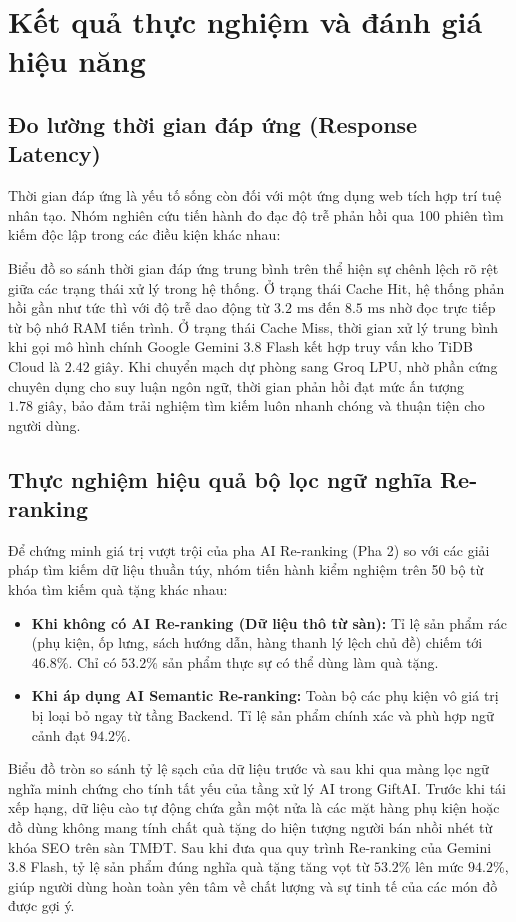 \section{Kết quả thực nghiệm và đánh giá hiệu năng}

\subsection{Đo lường thời gian đáp ứng (Response Latency)}
Thời gian đáp ứng là yếu tố sống còn đối với một ứng dụng web tích hợp trí tuệ nhân tạo. Nhóm nghiên cứu tiến hành đo đạc độ trễ phản hồi qua 100 phiên tìm kiếm độc lập trong các điều kiện khác nhau:


Biểu đồ so sánh thời gian đáp ứng trung bình trên thể hiện sự chênh lệch rõ rệt giữa các trạng thái xử lý trong hệ thống. Ở trạng thái Cache Hit, hệ thống phản hồi gần như tức thì với độ trễ dao động từ $3.2\text{ ms}$ đến $8.5\text{ ms}$ nhờ đọc trực tiếp từ bộ nhớ RAM tiến trình. Ở trạng thái Cache Miss, thời gian xử lý trung bình khi gọi mô hình chính Google Gemini 3.8 Flash kết hợp truy vấn kho TiDB Cloud là $2.42\text{ giây}$. Khi chuyển mạch dự phòng sang Groq LPU, nhờ phần cứng chuyên dụng cho suy luận ngôn ngữ, thời gian phản hồi đạt mức ấn tượng $1.78\text{ giây}$, bảo đảm trải nghiệm tìm kiếm luôn nhanh chóng và thuận tiện cho người dùng.

\subsection{Thực nghiệm hiệu quả bộ lọc ngữ nghĩa Re-ranking}
Để chứng minh giá trị vượt trội của pha AI Re-ranking (Pha 2) so với các giải pháp tìm kiếm dữ liệu thuần túy, nhóm tiến hành kiểm nghiệm trên 50 bộ từ khóa tìm kiếm quà tặng khác nhau:
\begin{itemize}
    \item \textbf{Khi không có AI Re-ranking (Dữ liệu thô từ sàn):}
    Tỉ lệ sản phẩm rác (phụ kiện, ốp lưng, sách hướng dẫn, hàng thanh lý lệch chủ đề) chiếm tới $\mathbf{46.8\%}$. Chỉ có $53.2\%$ sản phẩm thực sự có thể dùng làm quà tặng.
    \item \textbf{Khi áp dụng AI Semantic Re-ranking:}
    Toàn bộ các phụ kiện vô giá trị bị loại bỏ ngay từ tầng Backend. Tỉ lệ sản phẩm chính xác và phù hợp ngữ cảnh đạt $\mathbf{94.2\%}$.
\end{itemize}

Biểu đồ tròn so sánh tỷ lệ sạch của dữ liệu trước và sau khi qua màng lọc ngữ nghĩa minh chứng cho tính tất yếu của tầng xử lý AI trong GiftAI. Trước khi tái xếp hạng, dữ liệu cào tự động chứa gần một nửa là các mặt hàng phụ kiện hoặc đồ dùng không mang tính chất quà tặng do hiện tượng người bán nhồi nhét từ khóa SEO trên sàn TMĐT. Sau khi đưa qua quy trình Re-ranking của Gemini 3.8 Flash, tỷ lệ sản phẩm đúng nghĩa quà tặng tăng vọt từ $53.2\%$ lên mức $94.2\%$, giúp người dùng hoàn toàn yên tâm về chất lượng và sự tinh tế của các món đồ được gợi ý.

